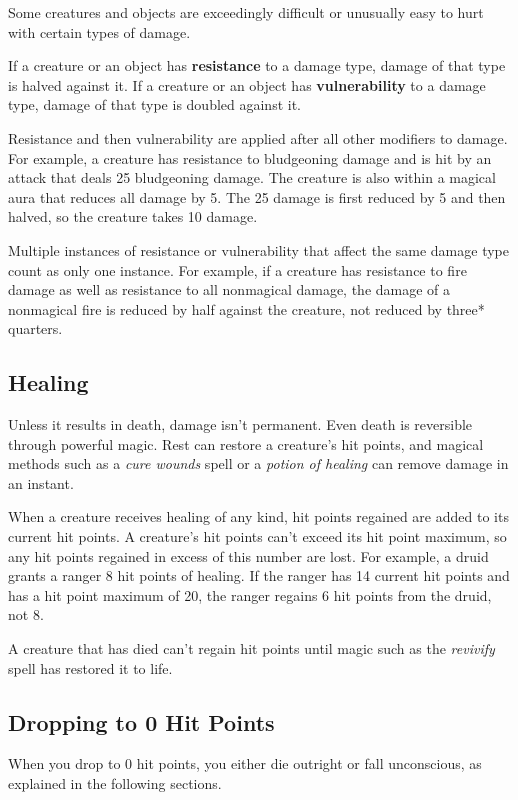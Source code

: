 Some creatures and objects are exceedingly difficult or unusually easy to hurt with certain types of damage.

If a creature or an object has \textbf{resistance} to a damage type, damage of that type is halved against it. If a creature or an object has \textbf{vulnerability} to a damage type, damage of that type is doubled against it.

Resistance and then vulnerability are applied after all other modifiers to damage. For example, a creature has resistance to bludgeoning damage and is hit by an attack that deals 25 bludgeoning damage. The creature is also within a magical aura that reduces all damage by 5. The 25 damage is first reduced by 5 and then halved, so the creature takes 10 damage.

Multiple instances of resistance or vulnerability that affect the same damage type count as only one instance. For example, if a creature has resistance to fire damage as well as resistance to all nonmagical damage, the damage of a nonmagical fire is reduced by half against the creature, not reduced by three* quarters.

\subsection{Healing}

Unless it results in death, damage isn't permanent. Even death is reversible through powerful magic. Rest can restore a creature's hit points, and magical methods such as a \textit{cure wounds} spell or a \textit{potion of healing} can remove damage in an instant.

When a creature receives healing of any kind, hit points regained are added to its current hit points. A creature's hit points can't exceed its hit point maximum, so any hit points regained in excess of this number are lost. For example, a druid grants a ranger 8 hit points of healing. If the ranger has 14 current hit points and has a hit point maximum of 20, the ranger regains 6 hit points from the druid, not 8.

A creature that has died can't regain hit points until magic such as the \textit{revivify} spell has restored it to life.

\subsection{Dropping to 0 Hit Points}

When you drop to 0 hit points, you either die outright or fall unconscious, as explained in the following sections.

